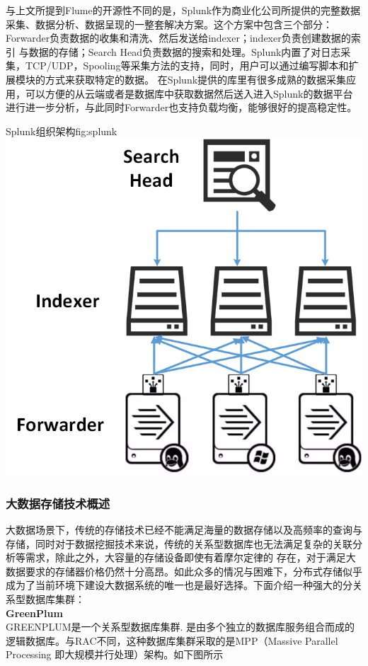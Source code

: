 \documentclass{HustGraduPaper}
\begin{document}
    与上文所提到Flume的开源性不同的是，Splunk作为商业化公司所提供的完整数据采集、数据分析、数据呈现的一整套解决方案。这个方案中包含三个部分：Forwarder负责数据的收集和清洗、然后发送给indexer；indexer负责创建数据的索引
    与数据的存储；Search Head负责数据的搜索和处理。Splunk内置了对日志采集，TCP/UDP，Spooling等采集方法的支持，同时，用户可以通过编写脚本和扩展模块的方式来获取特定的数据。
    在Splunk提供的库里有很多成熟的数据采集应用，可以方便的从云端或者是数据库中获取数据然后送入进入Splunk的数据平台进行进一步分析，与此同时Forwarder也支持负载均衡，能够很好的提高稳定性。
    
    \begin{generalfig}[htb]{Splunk组织架构}{fig:splunk} 
        \includegraphics[scale = 0.4]{Figures/splunk.png}
    \end{generalfig}

    \subsubsection{大数据存储技术概述}
    大数据场景下，传统的存储技术已经不能满足海量的数据存储以及高频率的查询与存储，同时对于数据挖掘技术来说，传统的关系型数据库也无法满足复杂的关联分析等需求，除此之外，大容量的存储设备即使有着摩尔定律的
    存在，对于满足大数据要求的存储器价格仍然十分高昂。如此众多的情况与困难下，分布式存储似乎成为了当前环境下建设大数据系统的唯一也是最好选择。下面介绍一种强大的分关系型数据库集群：\\
    {\songti \bfseries GreenPlum\\}
    GREENPLUM是一个关系型数据库集群. 是由多个独立的数据库服务组合而成的逻辑数据库。与RAC不同，这种数据库集群采取的是MPP（Massive Parallel Processing 即大规模并行处理）架构。如下图所示
\end{document}
